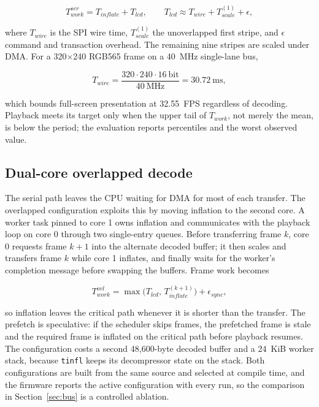 \documentclass[11pt,twocolumn]{article}
\begin{document}
\begin{equation}
T_{work}^{ser}=T_{inflate}+T_{lcd},\qquad
T_{lcd}\approx T_{wire}+T_{scale}^{(1)}+\epsilon,
\label{eq:work}
\end{equation}

where $T_{wire}$ is the SPI wire time, $T_{scale}^{(1)}$ the unoverlapped
first stripe, and $\epsilon$ command and transaction overhead.  The remaining
nine stripes are scaled under DMA.  For a 320$\times$240 RGB565 frame on a
40~MHz single-lane bus,

\begin{equation}
T_{wire}=\frac{320\cdot240\cdot16\ \text{bit}}{40\ \text{MHz}}=30.72\ \text{ms},
\label{eq:wire}
\end{equation}

which bounds full-screen presentation at 32.55~FPS regardless of decoding.
Playback meets its target only when the upper tail of $T_{work}$, not merely
the mean, is below the period; the evaluation reports percentiles and the
worst observed value.

\subsection{Dual-core overlapped decode}
\label{sec:overlap}

The serial path leaves the CPU waiting for DMA for most of each transfer.
The overlapped configuration exploits this by moving inflation to the second
core.  A worker task pinned to core 1 owns inflation and communicates with
the playback loop on core 0 through two single-entry queues.  Before
transferring frame $k$, core 0 requests frame $k+1$ into the alternate
decoded buffer; it then scales and transfers frame $k$ while core 1 inflates,
and finally waits for the worker's completion message before swapping the
buffers.  Frame work becomes

\begin{equation}
T_{work}^{ovl}=\max\bigl(T_{lcd},\,T_{inflate}^{(k+1)}\bigr)+\epsilon_{sync},
\label{eq:overlap}
\end{equation}

so inflation leaves the critical path whenever it is shorter than the
transfer.  The prefetch is speculative: if the scheduler skips frames, the
prefetched frame is stale and the required frame is inflated on the critical
path before playback resumes.  The configuration costs a second 48,600-byte
decoded buffer and a 24~KiB worker stack, because \texttt{tinfl} keeps its
decompressor state on the stack.  Both configurations are built from the same
source and selected at compile time, and the firmware reports the active
configuration with every run, so the comparison in Section~\ref{sec:bus} is a
controlled ablation.
\end{document}
